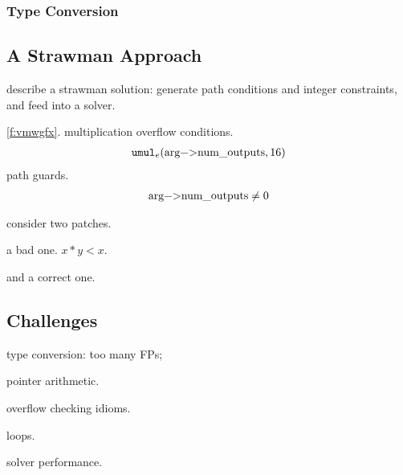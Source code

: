 \subsubsection*{Type Conversion}

\subsection{A Strawman Approach}

describe a strawman solution:
generate path conditions and integer constraints,
and feed into a solver.

\autoref{f:vmwgfx}.
multiplication overflow conditions.
\begin{align*}
\umule(\text{\lstinline!arg->num_outputs!}, 16)
\end{align*}
path guards.
\begin{align*}
\text{\lstinline!arg->num_outputs!} \neq 0
\end{align*}

consider two patches.

a bad one.
$x * y < x$.

and a correct one.

\subsection{Challenges}

type conversion: too many FPs;

pointer arithmetic.

overflow checking idioms.

loops.

solver performance.
